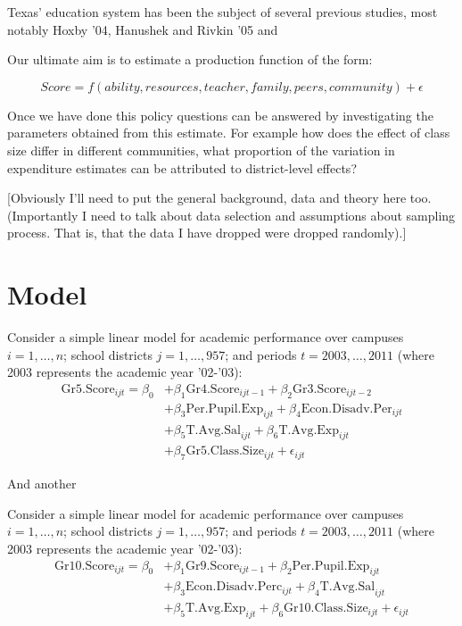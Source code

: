 \documentclass[11pt]{article}
\begin{document}
Texas' education system has been the subject of several previous studies, most notably Hoxby '04, Hanushek and Rivkin '05 and 



Our ultimate aim is to estimate a production function of the form:

$$Score = f(ability,resources,teacher,family,peers,community) + \epsilon$$

Once we have done this policy questions can be answered by investigating the parameters obtained from this estimate. For example how does the effect of class size differ in different communities, what proportion of the variation in expenditure estimates can be attributed to district-level effects?

[Obviously I'll need to put the general background, data and theory here too. (Importantly I need to talk about data selection and assumptions about sampling process. That is, that the data I have dropped were dropped randomly).]

\section{Model}
\label{s:next}

Consider a simple linear model for academic performance over campuses $i=1,\ldots,n$; school districts $j=1,\ldots,957$; and periods $t=2003,\ldots,2011$ (where 2003 represents the academic year '02-'03):
  \begin{align*}
\mathrm{Gr5.Score}_{ijt} = \beta_{0} 
&+ \beta_{1}  \mathrm{Gr4.Score}_{ijt-1} 
+ \beta_{2}  \mathrm{Gr3.Score}_{ijt-2}    \\
&+ \beta_{3}  \mathrm{Per.Pupil.Exp}_{ijt} 
+ \beta_{4}  \mathrm{Econ.Disadv.Per}_{ijt} \\
&+ \beta_{5}  \mathrm{T.Avg.Sal}_{ijt}   
+ \beta_{6}  \mathrm{T.Avg.Exp}_{ijt}  \\
&+ \beta_{7}  \mathrm{Gr5.Class.Size}_{ijt} + \epsilon_{ijt}
\end{align*}

And another

Consider a simple linear model for academic performance over campuses $i=1,\ldots,n$; school districts $j=1,\ldots,957$; and periods $t=2003,\ldots,2011$ (where 2003 represents the academic year '02-'03):
  \begin{align*}
\mathrm{Gr10.Score}_{ijt} = \beta_{0} 
&+ \beta_{1}  \mathrm{Gr9.Score}_{ijt-1} 
+ \beta_{2}  \mathrm{Per.Pupil.Exp}_{ijt} \\
&+ \beta_{3}  \mathrm{Econ.Disadv.Perc}_{ijt} 
+ \beta_{4}  \mathrm{T.Avg.Sal}_{ijt}  \\
&+ \beta_{5}  \mathrm{T.Avg.Exp}_{ijt}  
+ \beta_{6}  \mathrm{Gr10.Class.Size}_{ijt} + \epsilon_{ijt}
\end{align*}
\end{document}
